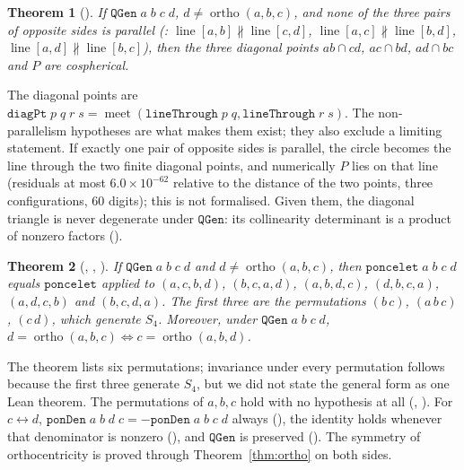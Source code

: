 \documentclass[11pt]{article}
\newtheorem{theorem}{Theorem}
\theoremstyle{definition}
\theoremstyle{remark}
\newcommand{\lean}[1]{\texttt{#1}}
\begin{document}
\begin{theorem}[]\label{thm:diag}
If $\lean{QGen}\;a\;b\;c\;d$, $d\neq\operatorname{ortho}(a,b,c)$, and none of the three pairs of opposite
sides is parallel (: $\operatorname{line}[a,b]\not\parallel\operatorname{line}[c,d]$,
$\operatorname{line}[a,c]\not\parallel\operatorname{line}[b,d]$, $\operatorname{line}[a,d]\not\parallel\operatorname{line}[b,c]$),
then the three diagonal points $ab\cap cd$, $ac\cap bd$, $ad\cap bc$ and $P$ are cospherical.
\end{theorem}
The diagonal points are $\lean{diagPt}\;p\;q\;r\;s=\operatorname{meet}(\lean{lineThrough}\;p\;q,\lean{lineThrough}\;r\;s)$.
The non-parallelism hypotheses are what makes them exist; they also exclude a limiting statement. If
exactly one pair of opposite sides is parallel, the circle becomes the line through the two finite
diagonal points, and numerically $P$ lies on that line (residuals at most $6.0\times10^{-62}$ relative to
the distance of the two points, three configurations, 60 digits); this is not formalised. Given them, the diagonal triangle is never
degenerate under $\lean{QGen}$: its collinearity determinant is a product of nonzero factors
().

\begin{theorem}[, , ]\label{thm:s4}
If $\lean{QGen}\;a\;b\;c\;d$ and $d\neq\operatorname{ortho}(a,b,c)$, then
$\lean{poncelet}\;a\;b\;c\;d$ equals $\lean{poncelet}$ applied to $(a,c,b,d)$, $(b,c,a,d)$, $(a,b,d,c)$,
$(d,b,c,a)$, $(a,d,c,b)$ and $(b,c,d,a)$. The first three are the permutations $(b\,c)$, $(a\,b\,c)$,
$(c\,d)$, which generate $S_4$. Moreover, under $\lean{QGen}\;a\;b\;c\;d$,
$d=\operatorname{ortho}(a,b,c)\iff c=\operatorname{ortho}(a,b,d)$.
\end{theorem}
The theorem lists six permutations; invariance under every permutation follows because the first three
generate $S_4$, but we did not state the general form as one Lean theorem. The permutations of $a,b,c$
hold with no hypothesis at all (, ). For
$c\leftrightarrow d$, $\lean{ponDen}\;a\;b\;d\;c=-\lean{ponDen}\;a\;b\;c\;d$ always
(), the identity holds whenever that denominator is nonzero
(), and $\lean{QGen}$ is preserved
(). The symmetry of orthocentricity is proved through
Theorem~\ref{thm:ortho} on both sides.
\end{document}
